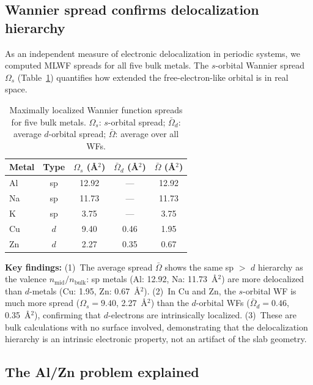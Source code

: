 \documentclass[twocolumn,showpacs,preprintnumbers,amsmath,amssymb,prb]{revtex4-2}
\begin{document}
\subsection{Wannier spread confirms delocalization hierarchy}

As an independent measure of electronic delocalization in
periodic systems, we computed MLWF spreads for all five
bulk metals.
The $s$-orbital Wannier spread $\Omega_s$ (Table~\ref{tab:wannier})
quantifies how extended the free-electron-like orbital is
in real space.

\begin{table}[h]
\caption{\label{tab:wannier}
Maximally localized Wannier function spreads for five bulk metals.
$\Omega_s$: $s$-orbital spread;
$\bar{\Omega}_d$: average $d$-orbital spread;
$\bar{\Omega}$: average over all WFs.}
\begin{ruledtabular}
\begin{tabular}{lcccc}
Metal & Type & $\Omega_s$ (\AA$^2$) & $\bar{\Omega}_d$ (\AA$^2$) & $\bar{\Omega}$ (\AA$^2$) \\
\hline
Al & sp & 12.92 & --- & 12.92 \\
Na & sp & 11.73 & --- & 11.73 \\
K  & sp &  3.75 & --- &  3.75 \\
Cu & $d$ &  9.40 & 0.46 & 1.95 \\
Zn & $d$ &  2.27 & 0.35 & 0.67 \\
\end{tabular}
\end{ruledtabular}
\end{table}

\textbf{Key findings:}
(1)~The average spread $\bar{\Omega}$ shows the same sp $>$ $d$
hierarchy as the valence $n_\mathrm{mid}/n_\mathrm{bulk}$:
sp metals (Al: 12.92, Na: 11.73~\AA$^2$) are more delocalized
than $d$-metals (Cu: 1.95, Zn: 0.67~\AA$^2$).
(2)~In Cu and Zn, the $s$-orbital WF is much more spread
($\Omega_s = 9.40$, 2.27~\AA$^2$) than the $d$-orbital WFs
($\bar{\Omega}_d = 0.46$, 0.35~\AA$^2$), confirming that
$d$-electrons are intrinsically localized.
(3)~These are bulk calculations with no surface involved,
demonstrating that the delocalization hierarchy is an
intrinsic electronic property, not an artifact of the
slab geometry.


\subsection{The Al/Zn problem explained}
\end{document}
